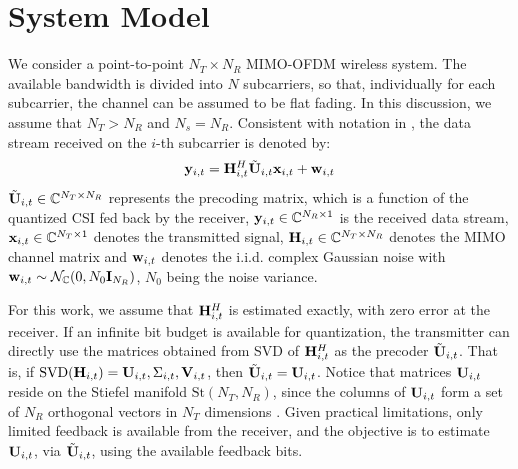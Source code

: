 \documentclass[conference]{IEEEtran}
\begin{document}
\section{System Model}
\label{section2}
\noindent We consider a point-to-point $N_T\times N_R$ MIMO-OFDM wireless system.
The available bandwidth is divided into $N$ subcarriers, so that, individually for each subcarrier, the channel can be assumed to be flat fading. In this discussion, we assume that $N_T > N_R$ and $N_s = N_R$. Consistent with notation in \cite{6891198,Gupt1905:Predictive}, the data stream received on the $i$-th subcarrier is denoted by:
\begin{equation}
{\bf y}_{i,t}={\bf H}^{H}_{i,t}\tilde{{\bf U}}_{i,t}{\bf x}_{i,t}+ {\bf w}_{i,t}
\end{equation}
$\tilde{{\bf U}}_{i,t} \in \mathbb{C}^{N_T \times N_R}$ represents the precoding matrix, which is a function of the quantized CSI fed back by the receiver, ${\bf y}_{i,t} \in \mathbb{C}^{N_R \times 1}$ is the received data stream, ${\bf x}_{i,t} \in \mathbb{C}^{N_T \times 1}$ denotes the transmitted signal, ${\bf H}_{i,t} \in \mathbb{C}^{N_T \times N_R}$ denotes the MIMO channel matrix and ${\bf w}_{i,t}$ denotes the i.i.d. complex Gaussian noise with ${\bf w}_{i,t} \sim \mathcal{N}_{\mathbb{C}}(0,N_0{\bf I}_{N_R})$, $N_0$ being the noise variance.


For this work, we assume that ${\bf H}^{H}_{i,t}$ is estimated exactly, with zero error at the receiver.
If an infinite bit budget is available for quantization, the transmitter can directly use the matrices obtained from SVD of ${\bf H}^{H}_{i,t}$ as the precoder $\tilde{{\bf U}}_{i,t}$. 
That is, if $\text{SVD}({\bf H}_{i,t}) = {\bf U}_{i,t},\Sigma_{i,t}, {\bf V}_{i,t}$, then $\tilde{{\bf U}}_{i,t} = {\bf U}_{i,t}$.
Notice that matrices ${\bf U}_{i,t}$ reside on the Stiefel manifold $\text{St}(N_T,N_R)$, since the columns of ${\bf U}_{i,t}$ form a set of $N_R$ orthogonal vectors in $N_T$ dimensions \cite{Gupt1905:Predictive,6891198}.
Given practical limitations, only limited feedback is available from the receiver, and the objective is to estimate ${\bf U}_{i,t}$, via $\tilde{{\bf U}}_{i,t}$, using the available feedback bits.
\end{document}
